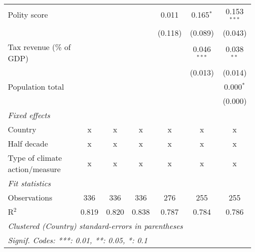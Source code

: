 \begin{tabular}{lcccccc}
   Polity score                                                         &         &         &                & 0.011          & 0.165$^{*}$    & 0.153$^{***}$\\   
                                                                        &         &         &                & (0.118)        & (0.089)        & (0.043)\\   
   Tax revenue (\% of GDP)                                              &         &         &                &                & 0.046$^{***}$  & 0.038$^{**}$\\   
                                                                        &         &         &                &                & (0.013)        & (0.014)\\   
   Population total                                                     &         &         &                &                &                & 0.000$^{*}$\\   
                                                                        &         &         &                &                &                & (0.000)\\   
   \emph{Fixed effects}\\
   Country                                                              & x       & x       & x              & x              & x              & x\\  
   Half decade                                                          & x       & x       & x              & x              & x              & x\\  
   Type of climate action/measure                                       & x       & x       & x              & x              & x              & x\\  
   \midrule \emph{Fit statistics}\\
   Observations                                                         & 336     & 336     & 336            & 276            & 255            & 255\\  
   R$^2$                                                                & 0.819   & 0.820   & 0.838          & 0.787          & 0.784          & 0.786\\  
   \midrule
   \multicolumn{7}{l}{\emph{Clustered (Country) standard-errors in parentheses}}\\
   \multicolumn{7}{l}{\emph{Signif. Codes: ***: 0.01, **: 0.05, *: 0.1}}\\
\end{tabular}
\par\endgroup


